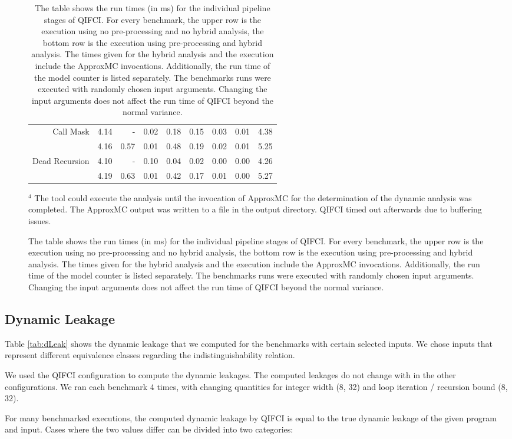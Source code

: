 \begin{figure}
\begin{table}[H]
{\begin{tabular}{r|r|r|r|rr|rr|r}
\multirow{2}{*}{Call Mask}              & 4.14           & -            & 0.02         & 0.18       & 0.15   & 0.03         & 0.01               & 4.38           \\
                                        & 4.16           & 0.57         & 0.01         & 0.48       & 0.19   & 0.02         & 0.01               & 5.25           \\\hline
\multirow{2}{*}{Dead Recursion}         & 4.10           & -            & 0.10         & 0.04       & 0.02   & 0.00         & 0.00               & 4.26           \\
                                        & 4.19           & 0.63         & 0.01         & 0.42       & 0.17   & 0.01         & 0.00               & 5.27          
\end{tabular}
}
\caption{The table shows the run times (in ms) for the individual pipeline stages of QIFCI. For every benchmark, the upper row is the execution using no pre-processing and no hybrid analysis, the bottom row is the execution using pre-processing and hybrid analysis. The times given for the hybrid analysis and the execution include the ApproxMC invocations. Additionally, the run time of the model counter is listed separately. The benchmarks runs were executed with randomly chosen input arguments. Changing the input arguments does not affect the run time of QIFCI beyond the normal variance.}\label{tab:time}
\end{table}
{\footnotesize $^4$ The tool could execute the analysis until the invocation of ApproxMC for the determination of the dynamic analysis was completed. The ApproxMC output was written to a file in the output directory. QIFCI timed out afterwards due to buffering issues.}
\end{figure}
\subsection{Dynamic Leakage}
Table \ref{tab:dLeak} shows the dynamic leakage that we computed for the benchmarks with certain selected inputs. We chose inputs that represent different equivalence classes regarding the indistinguishability relation.

We used the QIFCI configuration to compute the dynamic leakages. The computed leakages do not change with in the other configurations. We ran each benchmark 4 times, with changing quantities for integer width (8, 32) and loop iteration / recursion bound (8, 32).

For many benchmarked executions, the computed dynamic leakage by QIFCI is equal to the true dynamic leakage of the given program and input. Cases where the two values differ can be divided into two categories:

